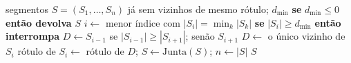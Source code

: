 \begin{algorithm}[t]
  \caption{Absorção de segmentos curtos. $|S_i|$: duração do segmento $S_i$.}
  \label{alg:duracao}
  \begin{algorithmic}[1]
    \REQUIRE segmentos $S = (S_1, \dots, S_n)$ já sem vizinhos de mesmo rótulo; $d_{\min}$
    \STATE \textbf{se} $d_{\min} \le 0$ \textbf{então devolva} $S$
      \STATE $i \leftarrow$ menor índice com $|S_i| = \min_k |S_k|$ 
      \STATE \textbf{se} $|S_i| \ge d_{\min}$ \textbf{então interrompa}
        \STATE $D \leftarrow S_{i-1}$ se $|S_{i-1}| \ge |S_{i+1}|$; senão $S_{i+1}$ 
      \ELSE
        \STATE $D \leftarrow$ o único vizinho de $S_i$ 
      \ENDIF
      \STATE rótulo de $S_i \leftarrow$ rótulo de $D$; \quad $S \leftarrow \mathrm{Junta}(S)$; \quad $n \leftarrow |S|$ 
    \ENDWHILE
    \RETURN $S$
  \end{algorithmic}
\end{algorithm}
